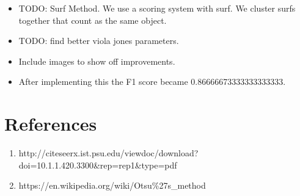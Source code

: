 \documentclass[a4paper]{article}
\begin{document}
\begin{itemize}
\item TODO: Surf Method. We use a scoring system with surf. We cluster surfs together that count as the same object.

\item TODO: find better viola jones parameters.

\item Include images to show off improvements.

\item After implementing this the F1 score became 0.86666673333333333333.

\end{itemize}

\section*{References}

\begin{enumerate}
\item http://citeseerx.ist.psu.edu/viewdoc/download?doi=10.1.1.420.3300\&rep=rep1\&type=pdf
\item https://en.wikipedia.org/wiki/Otsu\%27s\_method
\end{enumerate}

\vspace{-4em}
\end{document}
